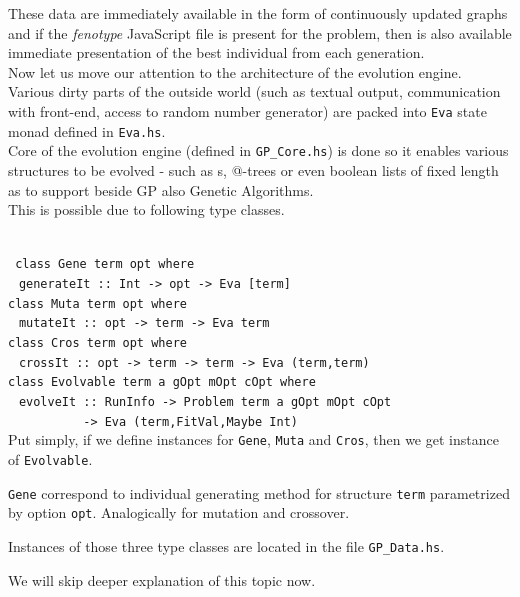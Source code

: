 \documentclass[12pt,a4paper]{report}
\makeatletter
\newcommand{\lets}{let us\xspace}
\newcommand{\atTree}{@-tree\xspace}
\makeatother
\begin{document}
These data are immediately available in the form of
continuously updated graphs and if 
the \textit{fenotype} JavaScript file is present 
for the problem, then is also available immediate 
presentation of the best individual from each generation.\\  
  
Now \lets move our attention to the architecture of the evolution engine.
Various dirty parts of the outside world (such as textual output,
communication with front-end, access to random number generator) are  
packed into \texttt{Eva} state monad defined in \texttt{Eva.hs}.\\
  
Core of the evolution engine (defined in \texttt{GP\_{}Core.hs})
is done so it enables various structures
to be evolved - such as \sexprTree{}s, \atTree{}s or even boolean lists
of fixed length as to support beside GP also Genetic Algorithms.\\[1em]

This is possible due to following type classes. 
 
~\\\texttt{
class Gene term opt where\\
$~\;\;$generateIt :: Int -> opt -> Eva [term]\\[1em]
class Muta term opt where\\
$~\;\;$mutateIt :: opt -> term -> Eva term \\[1em]
class Cros term opt where\\
$~\;\;$crossIt :: opt -> term -> term -> Eva (term,term) \\[1em]
class Evolvable term a gOpt mOpt cOpt where\\
$~\;\;$evolveIt :: RunInfo -> Problem term a gOpt mOpt cOpt  \\
$~~~~~~~~~~~~~~~~~~~~~~$
-> Eva (term,FitVal,Maybe Int)
} ~\\


Put simply, if we define instances for 
\texttt{Gene}, \texttt{Muta} and \texttt{Cros}, then we get
instance of \texttt{Evolvable}. 

\texttt{Gene} correspond to individual generating method for
structure \texttt{term} parametrized by option \texttt{opt}.
Analogically for mutation and crossover.

Instances of those three type classes are located in the file
\texttt{GP\_{}Data.hs}.

We will skip deeper explanation of this topic now.\\
\end{document}
